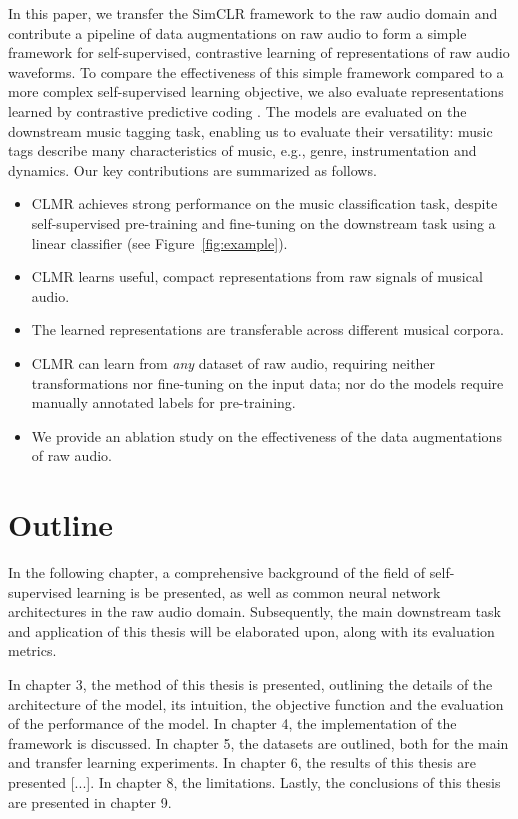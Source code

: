In this paper, we transfer the SimCLR framework \cite{chen_simple_2020} to the raw audio domain and contribute a pipeline of data augmentations on raw audio to form a simple framework for self-supervised, contrastive  learning of representations of raw audio waveforms. To compare the effectiveness of this simple framework compared to a more complex self-supervised learning objective, we also evaluate representations learned by contrastive predictive coding \cite{oord_representation_2019}. The models are evaluated on the downstream music tagging task, enabling us to evaluate their versatility: music tags describe many characteristics of music, e.g., genre, instrumentation and dynamics. Our key contributions are summarized as follows.
\begin{itemize}
    \item CLMR achieves strong performance on the music classification task, despite self-supervised pre-training and fine-tuning on the downstream task using a linear classifier (see Figure~\ref{fig:example}).
    \item CLMR learns useful, compact representations from raw signals of musical audio.
    \item The learned representations are transferable across different musical corpora.
    \item CLMR can learn from \emph{any} dataset of raw audio, requiring neither transformations nor fine-tuning on the input data; nor do the models require manually annotated labels for pre-training.
    \item We provide an ablation study on the effectiveness of the data augmentations of raw audio.
\end{itemize}


\section{Outline}
In the following chapter, a comprehensive background of the field of self-supervised learning is be presented, as well as common neural network architectures in the raw audio domain. Subsequently, the main downstream task and application of this thesis will be elaborated upon, along with its evaluation metrics.

In chapter 3, the method of this thesis is presented, outlining the details of the architecture of the model, its intuition, the objective function and the evaluation of the performance of the model. In chapter 4, the implementation of the framework is discussed. In chapter 5, the datasets are outlined, both for the main and transfer learning experiments. In chapter 6, the results of this thesis are presented [...]. In chapter 8, the limitations. Lastly, the conclusions of this thesis are presented in chapter 9.


